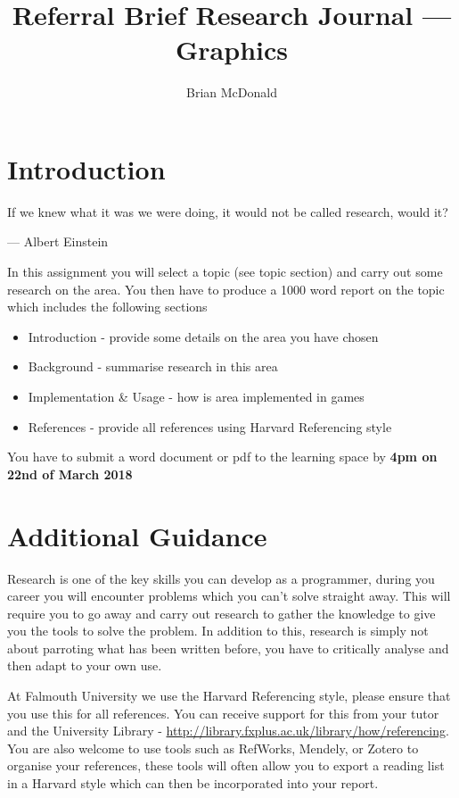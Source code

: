 \documentclass{../../fal_assignment}
\title{Referral Brief Research Journal --- Graphics}
\author{Brian McDonald}
\begin{document}
	
	\maketitle
	
	\section*{Introduction}
	
	\begin{marginquote}
		If we knew what it was we were doing, it would not be called research, would it?
		
		--- Albert Einstein
		
	\end{marginquote}
	
	In this assignment you will select a topic (see topic section) and carry out some research on the area. You then have to produce a 1000 word report on the topic which includes the following sections
	
	\begin{itemize}
		\item Introduction - provide some details on the area you have chosen
		\item Background - summarise research in this area
		\item Implementation \& Usage - how is area implemented in games
		\item References - provide all references using Harvard Referencing style 
	\end{itemize}
	
	You have to submit a word document or pdf to the learning space by \textbf{4pm on 22nd of March 2018}
	
	\section*{Additional Guidance}
	Research is one of the key skills you can develop as a programmer, during you career you will encounter problems which you can't solve straight away. This will require you to go away and carry out research to gather the knowledge to give you the tools to solve the problem. In addition to this, research is simply not about parroting what has been written before, you have to critically analyse and then adapt to your own use.
	
	At Falmouth University we use the Harvard Referencing style, please ensure that you use this  for all references. You can receive support for this from your tutor and the University Library - \url{http://library.fxplus.ac.uk/library/how/referencing}. You are also welcome to use tools such as RefWorks, Mendely, or Zotero to organise your references, these tools will often allow you to export a reading list in a Harvard style which can then be incorporated into your report.
	
\end{document}
